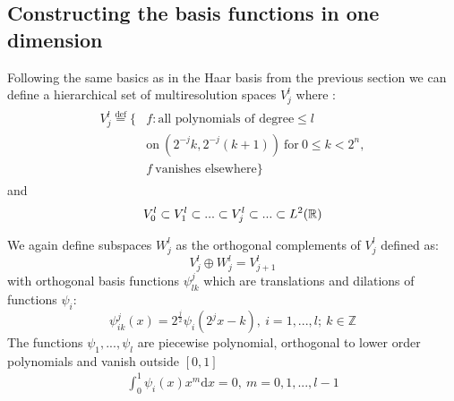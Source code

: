 \documentclass[../master_thesis.tex]{subfiles}
\begin{document}
\subsection{Constructing the basis functions in one dimension}
Following the same basics as in the Haar basis from the previous section we can
define a hierarchical set of multiresolution spaces $V_j^l$ where \cite{Frediani:2013}:
\begin{align}
  \begin{split}
    V_j^l \stackrel{\text{def}}{=} \{&f: \text{all polynomials of degree} \leqslant
    l\  \\
    &\text{on}\  (2^{-j}k,2^{-j}(k+1))\ \text{for}\ 0\leqslant k < 2^{n},\\
    &f\  \text{vanishes elsewhere}\}
  \end{split}
\end{align}
and
\begin{equation}
  V_0^l \subset V_1^l \subset ... \subset V^l_j \subset ... \subset L^2(\mathbb{R})
\end{equation}

We again define subspaces $W_j^l$ as the orthogonal complements of $V^l_j$
\cite{Alpert1993} defined as:
\begin{equation}
  V^l_j \oplus W_j^l = V^l_{j+1}
\end{equation}
 with orthogonal basis functions  $\psi^j_{lk}$ which are translations and dilations of functions $\psi_i$:
 \begin{equation}
   \psi^j_{ik}(x) = 2^\frac{j}{2}\psi_i(2^jx-k), \ i=1, ...,l;\ k \in \mathbb{Z}\label{eq:mwbasisfuncs}
 \end{equation}
 The functions $\psi_1, ...,\psi_l$ are piecewise polynomial, orthogonal to lower order polynomials and
 vanish outside $[0,1]$ \cite{Alpert1993}
\begin{align}
  \int_0^1\psi_i(x)x^m \text{d}x = 0,\ m = 0, 1, ..., l-1
\end{align}
\end{document}
